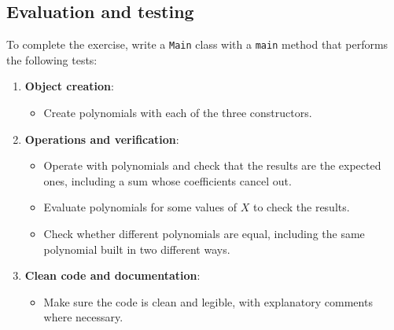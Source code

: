 \subsection{Evaluation and testing}

To complete the exercise, write a \texttt{Main} class with a \texttt{main} method that performs the following tests:

\begin{enumerate}

    \item \textbf{Object creation}:

        \begin{itemize}

            \item Create polynomials with each of the three constructors.

        \end{itemize}

    \item \textbf{Operations and verification}:

        \begin{itemize}

            \item Operate with polynomials and check that the results are the expected ones, including a sum whose coefficients cancel out.

            \item Evaluate polynomials for some values of \(X\) to check the results.

            \item Check whether different polynomials are equal, including the same polynomial built in two different ways.

        \end{itemize}

    \item \textbf{Clean code and documentation}:

        \begin{itemize}

            \item Make sure the code is clean and legible, with explanatory comments where necessary.

        \end{itemize}

\end{enumerate}
